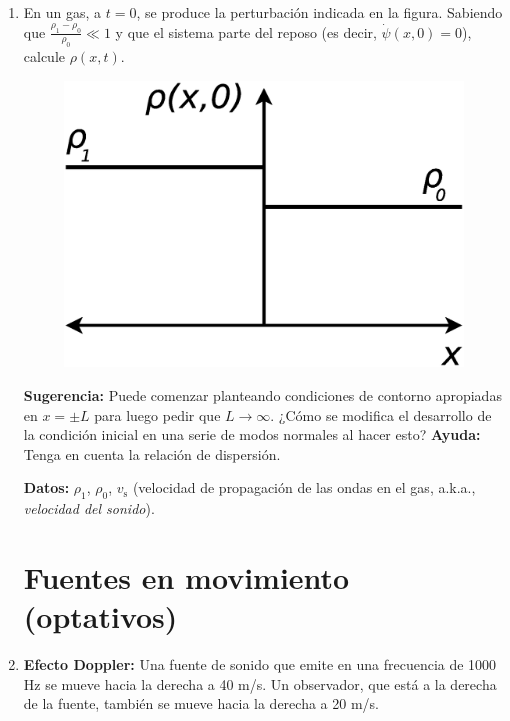 \documentclass[11pt,spanish]{article}
\begin{document}
\begin{enumerate}
    
    \item En un gas, a $t=0$, se produce la perturbación indicada en la figura.
    Sabiendo que $\frac{\rho_{1}-\rho_{0}}{\rho_{0}}\ll1$
    y que el sistema parte del reposo (es decir, $\dot\psi(x,0)=0$), calcule
    $\rho(x,t)$. 

    \begin{figure}[H]
        \centering{}\includegraphics[clip,scale=0.25]{figs/ej2-5}
    \end{figure}

    \textbf{Sugerencia:} Puede comenzar planteando condiciones de contorno
    apropiadas en $x= \pm L$ para luego pedir que $L \to \infty$. ¿Cómo se
    modifica el desarrollo de la condición inicial en una serie de modos
    normales al hacer esto? \textbf{Ayuda:} Tenga en cuenta la relación de
    dispersión.

    \textbf{Datos:} $\rho_{1}$, $\rho_{0}$, $v_\text{s}$ (velocidad de
    propagación de las ondas en el gas, a.k.a., \textit{velocidad del sonido}).

\section*{Fuentes en movimiento (optativos)}


	\item \textbf{Efecto Doppler:} Una fuente de sonido que emite en una
	frecuencia de 1000 Hz se mueve hacia la derecha a 40 m/s. Un observador,
	que está a la derecha de la fuente, también se mueve hacia la derecha
	a 20 m/s.


\end{enumerate}
\end{document}

